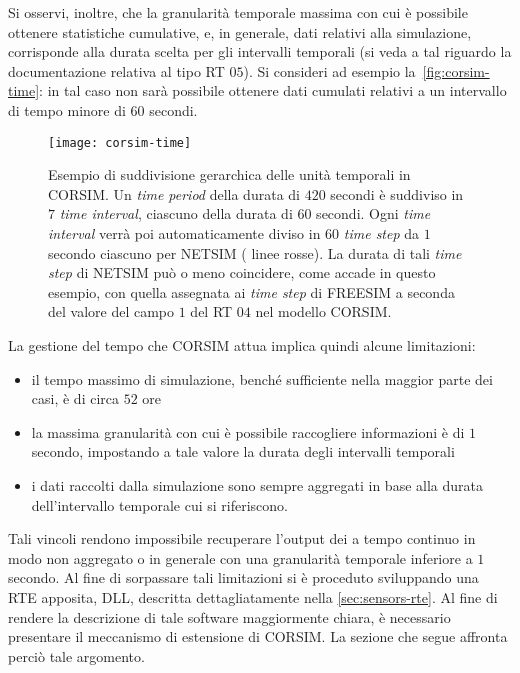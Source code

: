 Si osservi, inoltre, che la granularità temporale massima con cui è possibile ottenere statistiche cumulative, e, in generale, dati relativi alla simulazione, corrisponde alla durata scelta per gli intervalli temporali (si veda a tal riguardo la documentazione relativa al tipo \acs{RT} $05$). Si consideri ad esempio la~\vref{fig:corsim-time}: in tal caso non sarà possibile ottenere dati cumulati relativi a un intervallo di tempo minore di $60$ secondi.
\begin{figure}[htbp]
    \centering
    \texttt{[image: corsim-time]}
    \caption[Gestione del tempo in \acs{CORSIM}]{Esempio di suddivisione gerarchica delle unità temporali in \acs{CORSIM}. Un \emph{time period} della durata di $420$ secondi è suddiviso in $7$ \emph{time interval}, ciascuno della durata di $60$ secondi. Ogni \emph{time interval} verrà poi automaticamente diviso in $60$ \emph{time step} da $1$ secondo ciascuno per \acs{NETSIM} (\ie{} linee rosse). La durata di tali \emph{time step} di \acs{NETSIM} può o meno coincidere, come accade in questo esempio, con quella assegnata ai \emph{time step} di \acs{FREESIM} a seconda del valore del campo $1$ del \acs{RT} $04$ nel modello \acs{CORSIM}.}
    \label{fig:corsim-time}
\end{figure}

La gestione del tempo che \acs{CORSIM} attua implica quindi alcune limitazioni:
\begin{itemize}
    \item il tempo massimo di simulazione, benché sufficiente nella maggior parte dei casi, è di circa $52$ ore
    \item la massima granularità con cui è possibile raccogliere informazioni è di $1$ secondo, impostando a tale valore la durata degli intervalli temporali
    \item i dati raccolti dalla simulazione sono sempre aggregati in base alla durata dell'intervallo temporale cui si riferiscono.
\end{itemize}
Tali vincoli rendono impossibile recuperare l'output dei  a tempo continuo in modo non aggregato o in generale con una granularità temporale inferiore a $1$ secondo. Al fine di sorpassare tali limitazioni si è proceduto sviluppando una \acl{RTE} apposita,  \acs{DLL}, descritta dettagliatamente nella \vref{sec:sensors-rte}. Al fine di rendere la descrizione di tale software maggiormente chiara, è necessario presentare il meccanismo di estensione di \acs{CORSIM}. La sezione che segue affronta perciò tale argomento.

